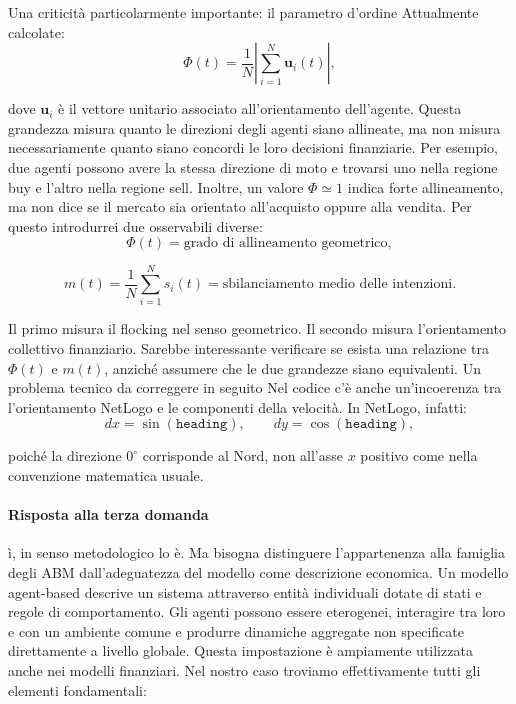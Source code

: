 Una criticità particolarmente importante: il parametro d'ordine
Attualmente calcolate:
\[
\Phi(t)=\frac{1}{N}
\left|\sum_{i=1}^{N}\mathbf u_i(t)\right|,
\]

dove \(\mathbf u_i\) è il vettore unitario associato all'orientamento dell'agente.
Questa grandezza misura quanto le direzioni degli agenti siano allineate, ma non misura necessariamente quanto siano concordi le loro decisioni finanziarie.
Per esempio, due agenti possono avere la stessa direzione di moto e trovarsi uno nella regione buy e l'altro nella regione sell.
Inoltre, un valore \(\Phi\simeq 1\) indica forte allineamento, ma non dice se il mercato sia orientato all'acquisto oppure alla vendita.
Per questo introdurrei due osservabili diverse:
\[
\Phi(t)=\text{grado di allineamento geometrico},
\]

\[
m(t)=\frac{1}{N}\sum_{i=1}^{N}s_i(t)
=\text{sbilanciamento medio delle intenzioni}.
\]

Il primo misura il flocking nel senso geometrico. Il secondo misura l'orientamento collettivo finanziario.
Sarebbe interessante verificare se esista una relazione tra \(\Phi(t)\) e \(m(t)\), anziché assumere che le due grandezze siano equivalenti.
Un problema tecnico da correggere in seguito
Nel codice c'è anche un'incoerenza tra l'orientamento NetLogo e le componenti della velocità.
In NetLogo, infatti:
\[
dx=\sin(\texttt{heading}),\qquad
dy=\cos(\texttt{heading}),
\]

poiché la direzione \(0^\circ\) corrisponde al Nord, non all'asse \(x\) positivo come nella convenzione matematica usuale.

\paragraph{Risposta alla terza domanda}
ì, in senso metodologico lo è. Ma bisogna distinguere l'appartenenza alla famiglia degli ABM dall'adeguatezza del modello come descrizione economica.
Un modello agent-based descrive un sistema attraverso entità individuali dotate di stati e regole di comportamento. Gli agenti possono essere 
eterogenei, interagire tra loro e con un ambiente comune e produrre dinamiche aggregate non specificate direttamente a livello globale. Questa 
impostazione è ampiamente utilizzata anche nei modelli finanziari. Nel nostro caso troviamo effettivamente tutti gli elementi fondamentali:

